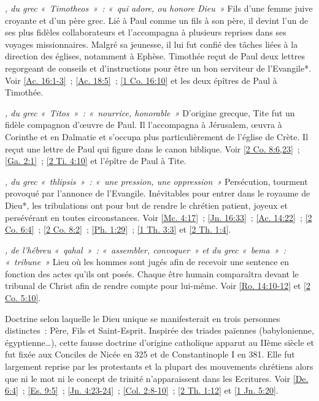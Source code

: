 \begin{multicols}{2}
\textit{, du grec «~Timotheos~»~: «~qui adore, ou honore Dieu~»}\newline
Fils d'une femme juive croyante et d'un père grec. Lié à Paul comme un fils à son père, il devint l'un de ses plus fidèles collaborateurs et l'accompagna à plusieurs reprises dans ses voyages missionnaires. Malgré sa jeunesse, il lui fut confié des tâches liées à la direction des églises, notamment à Ephèse. Timothée reçut de Paul deux lettres regorgeant de conseils et d'instructions pour être un bon serviteur de l'Evangile*. Voir \vref{Ac. 16:1-3}~; \vref{Ac. 18:5}~; \vref{1 Co. 16:10} et les deux épîtres de Paul à Timothée.

\textit{, du grec «~Titos~»~: «~nourrice, honorable~»}\newline
D'origine grecque, Tite fut un fidèle compagnon d'œuvre de Paul. Il l'accompagna à Jérusalem, œuvra à Corinthe et en Dalmatie et s'occupa plus particulièrement de l'église de Crète. Il reçut une lettre de Paul qui figure dans le canon biblique. Voir \vref{2 Co. 8:6,23}~; \vref{Ga. 2:1}~; \vref{2 Ti. 4:10} et l'épître de Paul à Tite.

\textit{, du grec «~thlipsis~»~: «~une pression, une oppression~»}\newline
Persécution, tourment provoqué par l'annonce de l'Evangile. Inévitables pour entrer dans le royaume de Dieu*, les tribulations ont pour but de rendre le chrétien patient, joyeux et persévérant en toutes circonstances. Voir \vref{Mc. 4:17}~; \vref{Jn. 16:33}~; \vref{Ac. 14:22}~; \vref{2 Co. 6:4}~; \vref{2 Co. 8:2}~; \vref{Ph. 1:29}~; \vref{1 Th. 3:3} et \vref{2 Th. 1:4}.

\textit{, de l'hébreu «~qahal~»~: «~assembler, convoquer~» et du grec «~bema~»~: «~tribune~»}\newline
Lieu où les hommes sont jugés afin de recevoir une sentence en fonction des actes qu'ils ont posés. Chaque être humain comparaîtra devant le tribunal de Christ afin de rendre compte pour lui-même. Voir \vref{Ro. 14:10-12} et \vref{2 Co. 5:10}.

\textit{}\newline
Doctrine selon laquelle le Dieu unique se manifesterait en trois personnes distinctes~: Père, Fils et Saint-Esprit. Inspirée des triades païennes (babylonienne, égyptienne…), cette fausse doctrine d'origine catholique apparut au IIème siècle et fut fixée aux Conciles de Nicée en 325 et de Constantinople I en 381. Elle fut largement reprise par les protestants et la plupart des mouvements chrétiens alors que ni le mot ni le concept de trinité n'apparaissent dans les Ecritures. Voir \vref{De. 6:4}~; \vref{Es. 9:5}~; \vref{Jn. 4:23-24}~; \vref{Col. 2:8-10}~; \vref{2 Th. 1:12} et \vref{1 Jn. 5:20}.


\end{multicols}
